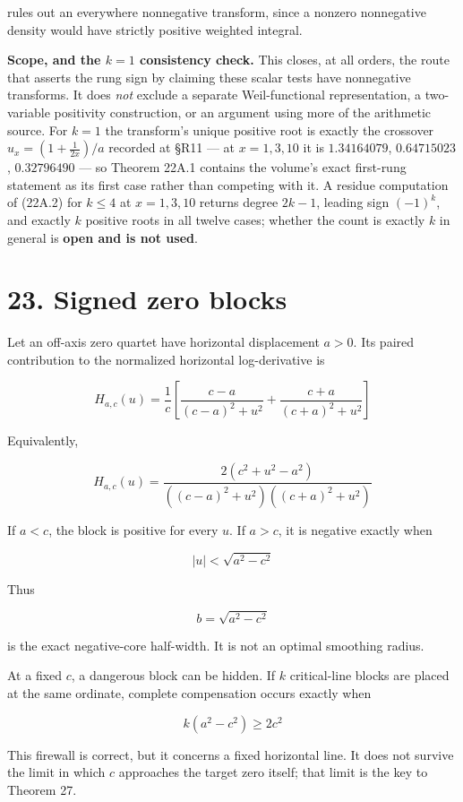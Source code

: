 \documentclass[
  11pt,
]{book}
\begin{document}
rules out an everywhere nonnegative transform, since a nonzero
nonnegative density would have strictly positive weighted integral.

\textbf{Scope, and the \(k=1\) consistency check.} This closes, at all
orders, the route that asserts the rung sign by claiming these scalar
tests have nonnegative transforms. It does \emph{not} exclude a separate
Weil-functional representation, a two-variable positivity construction,
or an argument using more of the arithmetic source. For \(k=1\) the
transform's unique positive root is exactly the crossover
\(u_x=(1+\tfrac1{2x})/a\) recorded at §R11 --- at \(x=1,3,10\) it is
\(1.34164079\), \(0.64715023\), \(0.32796490\) --- so Theorem 22A.1
contains the volume's exact first-rung statement as its first case
rather than competing with it. A residue computation of (22A.2) for
\(k\le4\) at \(x=1,3,10\) returns degree \(2k-1\), leading sign
\((-1)^k\), and exactly \(k\) positive roots in all twelve cases;
whether the count is exactly \(k\) in general is \textbf{open and is not
used}.

\section{23. Signed zero blocks}\label{signed-zero-blocks}

Let an off-axis zero quartet have horizontal displacement \(a>0\). Its
paired contribution to the normalized horizontal log-derivative is

\[
\boxed{
H_{a,c}(u)=\frac1c\left[
\frac{c-a}{(c-a)^2+u^2}
+\frac{c+a}{(c+a)^2+u^2}
\right]
}
\]

Equivalently,

\[
H_{a,c}(u)=
\frac{2(c^2+u^2-a^2)}
{((c-a)^2+u^2)((c+a)^2+u^2)}
\]

If \(a<c\), the block is positive for every \(u\). If \(a>c\), it is
negative exactly when

\[
|u|<\sqrt{a^2-c^2}
\]

Thus

\[
b=\sqrt{a^2-c^2}
\]

is the exact negative-core half-width. It is not an optimal smoothing
radius.

At a fixed \(c\), a dangerous block can be hidden. If \(k\)
critical-line blocks are placed at the same ordinate, complete
compensation occurs exactly when

\[
k(a^2-c^2)\ge2c^2
\]

This firewall is correct, but it concerns a fixed horizontal line. It
does not survive the limit in which \(c\) approaches the target zero
itself; that limit is the key to Theorem 27.
\end{document}
